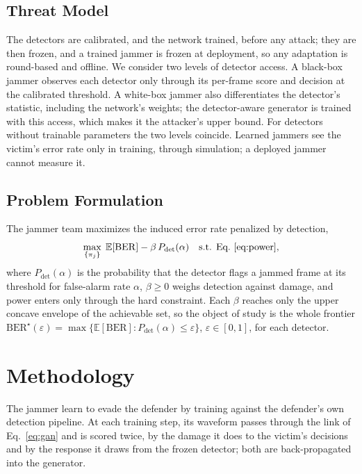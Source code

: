 \documentclass[conference]{IEEEtran}
\newcommand{\rar}[1]{{\color{blue}{[#1]}}}
\begin{document}
\subsection{Threat Model}
\label{sec:threat}
The detectors are calibrated, and the network trained, before any attack; they are then frozen, and a trained jammer is frozen at deployment, so any adaptation is round-based and offline.
We consider two levels of detector access.
A black-box jammer observes each detector only through its per-frame score and decision at the calibrated threshold.
A white-box jammer also differentiates the detector's statistic, including the network's weights; the detector-aware generator is trained with this access, which makes it the attacker's upper bound.
For detectors without trainable parameters the two levels coincide.
Learned jammers see the victim's error rate only in training, through simulation; a deployed jammer cannot measure it.

\subsection{Problem Formulation}
\label{sec:objective}
The jammer team maximizes the induced error rate penalized by detection,
\begin{equation}
\max_{\{\pi_j\}}\;\mathbb{E}[\mathrm{BER}]-\beta\,P_{\mathrm{det}}(\alpha)\quad\text{s.t. Eq.~\eqref{eq:power}},
\label{eq:problem}
\end{equation}
where $P_{\mathrm{det}}(\alpha)$ is the probability that the detector flags a jammed frame at its threshold for false-alarm rate $\alpha$, $\beta\ge0$ weighs detection against damage, and power enters only through the hard constraint.
Each $\beta$ reaches only the upper concave envelope of the achievable set, so the object of study is the whole frontier $\mathrm{BER}^\star(\varepsilon)=\max\{\mathbb{E}[\mathrm{BER}]:P_{\mathrm{det}}(\alpha)\le\varepsilon\}$, $\varepsilon\in[0,1]$, for each detector.

\section{Methodology}
\label{sec:method}
The jammer\rar{s} learn to evade the defender by training against the defender's own detection pipeline.
At each training step, its waveform passes through the link of Eq.~\eqref{eq:gan} and is scored twice, by the damage it does to the victim's decisions and by the response it draws from the frozen detector; both are back-propagated into the generator.
\end{document}
